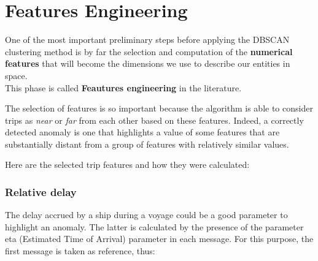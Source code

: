 \clearpage

\section{Features Engineering}
\label{sec:features}
    One of the most important preliminary steps before applying the DBSCAN clustering method is by far the selection and computation of the \textbf{numerical features} that will become the dimensions we use to describe our entities in space.
    \\
    This phase is called \textbf{Feautures engineering} in the literature. 
     
    The selection of features is so important because the algorithm is able to consider trips as \textit{near} or \textit{far} from each other based on these features. Indeed, a correctly detected anomaly is one that highlights a value of some features that are substantially distant from a group of features with relatively similar values.
    
    Here are the selected trip features and how they were calculated:
    
    
    
    \subsubsection{Relative delay}
    
        The delay accrued by a ship during a voyage could be a good parameter to highlight an anomaly. The latter is calculated by the presence of the parameter eta (Estimated Time of Arrival) parameter in each message. For this purpose, the first message is taken as reference, thus:
        
